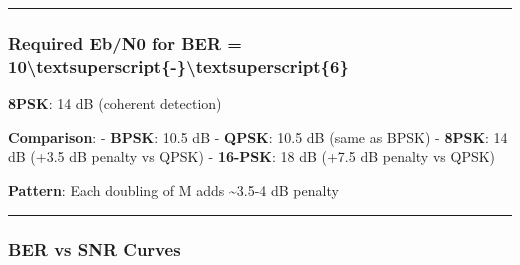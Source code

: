 \begin{center}\rule{0.5\linewidth}{0.5pt}\end{center}

\subsubsection{Required Eb/N0 for BER =
10\textbackslash textsuperscript\{-\}\textbackslash textsuperscript\{6\}}\label{required-ebn0-for-ber-10ux2076}

\textbf{8PSK}: 14 dB (coherent detection)

\textbf{Comparison}: - \textbf{BPSK}: 10.5 dB - \textbf{QPSK}: 10.5 dB
(same as BPSK) - \textbf{8PSK}: 14 dB (+3.5 dB penalty vs QPSK) -
\textbf{16-PSK}: 18 dB (+7.5 dB penalty vs QPSK)

\textbf{Pattern}: Each doubling of M adds \textasciitilde3.5-4 dB
penalty

\begin{center}\rule{0.5\linewidth}{0.5pt}\end{center}

\subsubsection{BER vs SNR Curves}\label{ber-vs-snr-curves}

